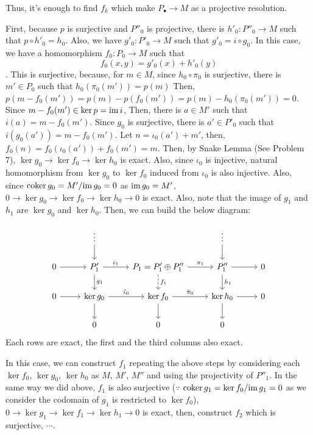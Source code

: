 Thus, it's enough to find \(f_k\) which make \(P_\bullet \to M\) as a projective resolution.

First, because \(p\) is surjective and \(P''_0\) is projective,
there is \(h'_0: P''_0 \to M\) such that \(p \circ h'_0 = h_0\).
Also, we have \(g'_0: P'_0 \to M\) such that \(g'_0 = i \circ g_0\).
In this case, we have a homomorphism \(f_0: P_0 \to M\) such that
\[f_0(x, y) = g'_0(x) + h'_0(y)\].
This is surjective, because,
for \(m \in M\), since \(h_0 \circ \pi_0\) is surjective,
there is \(m' \in P_0\) such that \(h_0(\pi_0(m')) = p(m)\)
Then, \(p(m - f_0(m')) = p(m) - p(f_0(m')) = p(m) - h_0(\pi_0(m')) = 0\).
Since \(m - f_0(m') \in \ker p = \textnormal{im}\, i\),
Then, there is \(a \in M'\) such that \(i(a) = m - f_0(m')\).
Since \(g_0\) is surjective, there is \(a' \in P'_0\) such that \(i(g_0(a')) = m - f_0(m')\).
Let \(n = \iota_0(a') + m'\), then, \(f_0(n) = f_0(\iota_0(a')) + f_0(m') = m\).
\br
\noindent
Then, by Snake Lemma (See Problem 7),
\(\ker g_0 \to \ker f_0 \to \ker h_0\) is exact.
Also, since \(\iota_0\) is injective, natural homomorphism from \(\ker g_0\) to \(\ker f_0\) induced from \(\iota_0\) is also injective.
Also, since \(\textnormal{coker}\, g_0 = M' / \textnormal{im}\, g_0 = 0\) as \(\textnormal{im}\, g_0 = M'\), \(0 \to \ker g_0 \to \ker f_0 \to \ker h_0 \to 0\) is exact.
Also, note that the image of \(g_1\) and \(h_1\) are \(\ker g_0\) and \(\ker h_0\). Then, we can build the below diagram:

\[
\begin{tikzcd}
 & \vdots \ar{d} & & \vdots \ar{d} & \\
0 \ar{r} & P'_1 \ar["\iota_1"]{r} \ar["g_1"]{d} & P_1 = P'_1 \oplus P''_1 \ar["\pi_1"]{r} \ar[dashed, "f_1"]{d} & P''_1 \ar{r} \ar["h_1"]{d} & 0 \\
0 \ar{r} & \ker g_0 \ar["\tilde \iota_0"]{r} \ar{d} & \ker f_0 \ar["\tilde \pi_0"]{r} \ar{d} & \ker h_0 \ar{r} \ar{d} & 0 \\
& 0 & 0 & 0 &
\end{tikzcd}
\]
Each rows are exact, the first and the third columns also exact.

In this case, we can construct \(f_1\) repeating the above steps by considering each \(\ker f_0\), \(\ker g_0\), \(\ker h_0\) as \(M\), \(M'\), \(M''\) and using the projectivity of \(P''_1\).
In the same way we did above, \(f_1\) is also surjective (\(\because\) \(\textnormal{coker}\, g_1 = \ker f_0 / \textnormal{im}\, g_1 = 0\) as we consider the codomain of \(g_1\) is restricted to \(\ker f_0\)), \(0 \to \ker g_1 \to \ker f_1 \to \ker h_1 \to 0\) is exact, then, construct \(f_2\) which is surjective, \(\cdots\).

